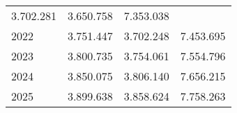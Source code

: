 \begin{tabular}{llll}
  \multicolumn{1}{|r}{3.702.281} &
  \multicolumn{1}{r}{3.650.758} &
  \multicolumn{1}{r}{7.353.038} \\
\multicolumn{1}{l}{\hspace{1em}2022} &
  \multicolumn{1}{|r}{3.751.447} &
  \multicolumn{1}{r}{3.702.248} &
  \multicolumn{1}{r}{7.453.695} \\
\multicolumn{1}{l}{\hspace{1em}2023} &
  \multicolumn{1}{|r}{3.800.735} &
  \multicolumn{1}{r}{3.754.061} &
  \multicolumn{1}{r}{7.554.796} \\
\multicolumn{1}{l}{\hspace{1em}2024} &
  \multicolumn{1}{|r}{3.850.075} &
  \multicolumn{1}{r}{3.806.140} &
  \multicolumn{1}{r}{7.656.215} \\
\multicolumn{1}{l}{\hspace{1em}2025} &
  \multicolumn{1}{|r}{3.899.638} &
  \multicolumn{1}{r}{3.858.624} &
  \multicolumn{1}{r}{7.758.263} \\
\cline{1-4}
\end{tabular}

